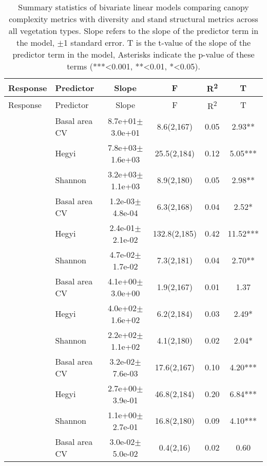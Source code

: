 \begin{longtable}{llcccS[table-format=-2.2, table-space-text-post = {***}]}
\caption[Bivariate linear model summary]{Summary statistics of bivariate linear models comparing canopy complexity metrics with diversity and stand structural metrics across all vegetation types. Slope refers to the slope of the predictor term in the model, $\pm$1 standard error. T is the t-value of the slope of the predictor term in the model, Asterisks indicate the p-value of these terms (***<0.001, **<0.01, *<0.05).} 
\label{tls:bivar_lm_summ_all} \\
\toprule
{Response} & {Predictor} & {Slope} & {F} & {R\textsuperscript{2}} & {T} \\ 
\midrule
\endfirsthead
\toprule
{Response} & {Predictor} & {Slope} & {F} & {R\textsuperscript{2}} & {T} \\ 
\midrule
\endhead
{} & Basal area CV &  8.7e+01$\pm$3.0e+01 & 8.6(2,167) & 0.05 & 2.93** \\ 
   & Hegyi &  7.8e+03$\pm$1.6e+03 & 25.5(2,184) & 0.12 & 5.05*** \\ 
   & Shannon &  3.2e+03$\pm$1.1e+03 & 8.9(2,180) & 0.05 & 2.98** \\ 
   \midrule
{} & Basal area CV &  1.2e-03$\pm$4.8e-04 & 6.3(2,168) & 0.04 & 2.52* \\ 
   & Hegyi &  2.4e-01$\pm$2.1e-02 & 132.8(2,185) & 0.42 & 11.52*** \\ 
   & Shannon &  4.7e-02$\pm$1.7e-02 & 7.3(2,181) & 0.04 & 2.70** \\ 
   \midrule
{} & Basal area CV &  4.1e+00$\pm$3.0e+00 & 1.9(2,167) & 0.01 & 1.37 \\ 
   & Hegyi &  4.0e+02$\pm$1.6e+02 & 6.2(2,184) & 0.03 & 2.49* \\ 
   & Shannon &  2.2e+02$\pm$1.1e+02 & 4.1(2,180) & 0.02 & 2.04* \\ 
   \midrule
{} & Basal area CV &  3.2e-02$\pm$7.6e-03 & 17.6(2,167) & 0.10 & 4.20*** \\ 
   & Hegyi &  2.7e+00$\pm$3.9e-01 & 46.8(2,184) & 0.20 & 6.84*** \\ 
   & Shannon &  1.1e+00$\pm$2.7e-01 & 16.8(2,180) & 0.09 & 4.10*** \\ 
   \midrule
{} & Basal area CV &  3.0e-02$\pm$5.0e-02 & 0.4(2,16) & 0.02 & 0.60 \\ 

\end{longtable}
